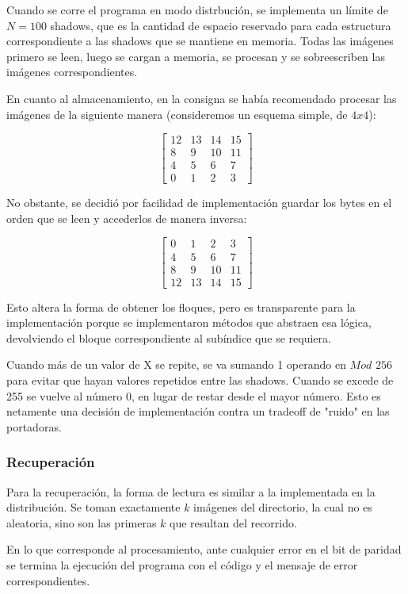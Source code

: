 \documentclass[11pt]{scrartcl} %
\begin{document}
Cuando se corre el programa en modo distrbución, se implementa un límite de $N = 100$ shadows, que es la cantidad de espacio reservado para cada estructura correspondiente a las shadows que se mantiene en memoria. Todas las imágenes primero se leen, luego se cargan a memoria, se procesan y se sobreescriben las imágenes correspondientes.

En cuanto al almacenamiento, en la consigna se había recomendado procesar las imágenes de la siguiente manera (consideremos un esquema simple, de $4x4$):

$$
\begin{bmatrix}
12 & 13 & 14 & 15 \\
8 & 9 & 10 & 11 \\
4 & 5 & 6 & 7 \\
0 & 1 & 2 & 3
\end{bmatrix}
$$

No obstante, se decidió por facilidad de implementación guardar los bytes en el orden que se leen y accederlos de manera inversa:

$$
\begin{bmatrix}
0 & 1 & 2 & 3 \\
4 & 5 & 6 & 7 \\
8 & 9 & 10 & 11 \\
12 & 13 & 14 & 15
\end{bmatrix}
$$

Esto altera la forma de obtener los floques, pero es transparente para la implementación porque se implementaron métodos que abstraen esa lógica, devolviendo el bloque correspondiente al subíndice que se requiera.

Cuando más de un valor de X se repite, se va sumando 1 operando en $Mod$ $256$ para evitar que hayan valores repetidos entre las shadows. Cuando se excede de 255 se vuelve al número 0, en lugar de restar desde el mayor número. Esto es netamente una decisión de implementación contra un tradeoff de "ruido" en las portadoras.

\subsubsection{Recuperación}

Para la recuperación, la forma de lectura es similar a la implementada en la distribución. Se toman exactamente $k$ imágenes del directorio, la cual no es aleatoria, sino son las primeras $k$ que resultan del recorrido.

En lo que corresponde al procesamiento, ante cualquier error en el bit de paridad se termina la ejecución del programa con el código y el mensaje de error correspondientes.
\end{document}
